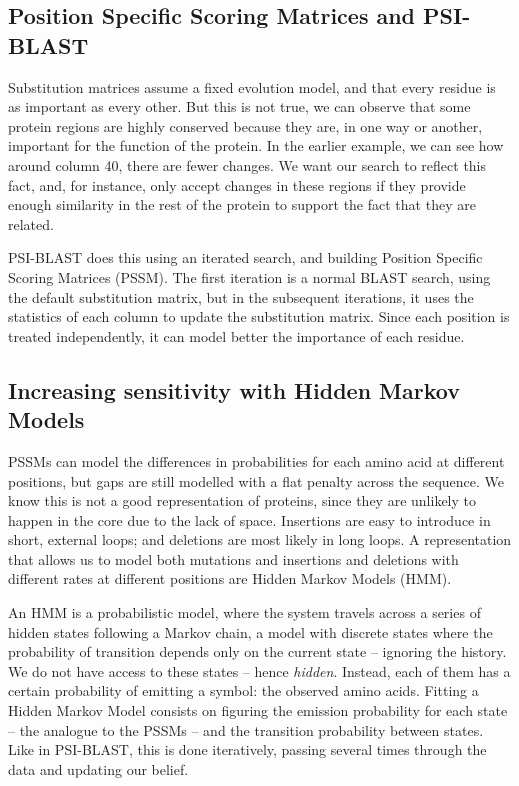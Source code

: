\subsection[PSSMs and PSI-BLAST]{Position Specific Scoring Matrices and PSI-BLAST}

Substitution matrices assume a fixed evolution model, and that every residue is as important as every other.
But this is not true, we can observe that some protein regions are highly conserved because they are, in one way or another, important for the function of the protein.
In the earlier example, we can see how around column 40, there are fewer changes.
We want our search to reflect this fact, and, for instance, only accept changes in these regions if they provide enough similarity in the rest of the protein to support the fact that they are related.

PSI-BLAST does this using an iterated search, and building Position Specific Scoring Matrices (PSSM).
The first iteration is a normal BLAST search, using the default substitution matrix, but in the subsequent iterations, it uses the statistics of each column to update the substitution matrix.
Since each position is treated independently, it can model better the importance of each residue.

\subsection[Hidden Markov Models]{Increasing sensitivity with Hidden Markov Models}
PSSMs can model the differences in probabilities for each amino acid at different positions, but gaps are still modelled with a flat penalty across the sequence.
We know this is not a good representation of proteins, since they are unlikely to happen in the core due to the lack of space.
Insertions are easy to introduce in short, external loops; and deletions are most likely in long loops. 
A representation that allows us to model both mutations and insertions and deletions with different rates at different positions are Hidden Markov Models (HMM).

An HMM  is a probabilistic model, where the system travels across a series of hidden states following a Markov chain, a model with discrete states where the probability of transition depends only on the current state -- ignoring the history.
We do not have access to these states -- hence \emph{hidden}.
Instead, each of them has a certain probability of emitting a symbol: the observed amino acids.
Fitting a Hidden Markov Model consists on figuring the emission probability for each state -- the analogue to the PSSMs -- and the transition probability between states.
Like in PSI-BLAST, this is done iteratively, passing several times through the data and updating our belief.

